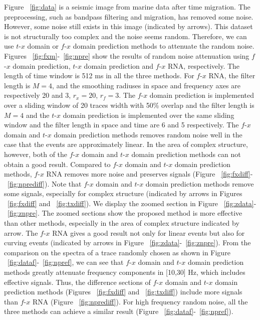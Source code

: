 Figure ~\ref{fig:data} is a seismic image from marine data after time migration. 
The preprocessing, such as bandpass filtering and migration, has removed some noise. 
However, some noise still exists in this image (indicated by arrows). This dataset is 
not structurally too complex and the noise seems random. Therefore, we can use $t$-$x$ 
domain or $f$-$x$ domain prediction methods to attenuate the random noise. 
Figures ~\ref{fig:fxm}-~\ref{fig:npre} show the results of random noise attenuation using 
$f$-$x$ domain prediction, $t$-$x$ domain prediction and $f$-$x$ RNA, respectively. The length of 
time window is 512 ms in all the three methods. For $f$-$x$ RNA, the filter length is $M=4$, 
and the smoothing radiuses in space and frequency axes are respectively 20 and 3, 
${{r}_{x}}=20$, ${{r}_{f}}=3$. The $f$-$x$ domain prediction is implemented over a 
sliding window of 20 traces width with 50\% overlap and the filter length is $M=4$ 
and the $t$-$x$ domain prediction is implemented over the same sliding window and the 
filter length in space and time are 6 and 5 respectively. The $f$-$x$ domain and $t$-$x$ 
domain prediction methods removes random noise well in the case that the events 
are approximately linear. In the area of complex structure, however, both of the 
$f$-$x$ domain and $t$-$x$ domain prediction methods can not obtain a good result. Compared 
to $f$-$x$ domain and $t$-$x$ domain prediction methods, $f$-$x$ RNA removes more noise and 
preserves signals (Figure ~\ref{fig:fxdiff}-~\ref{fig:nprediff}). 
Note that $f$-$x$ domain and $t$-$x$ domain prediction methods remove some signals, 
especially for complex structure (indicated by arrows in Figures ~\ref{fig:fxdiff} and ~\ref{fig:txdiff}). 
We display the zoomed section in Figure ~\ref{fig:zdata}-~\ref{fig:znpre}. 
The zoomed sections show the proposed method is more effective than other methods, 
especially in the area of complex structure indicated by arrow. The $f$-$x$ RNA gives 
a good result not only for linear events but also for curving events 
(indicated by arrows in Figure ~\ref{fig:zdata}-~\ref{fig:znpre}). 
From the comparison on the spectra of a trace randomly chosen as shown in 
Figure ~\ref{fig:dataf}-~\ref{fig:npref}, we can see that $f$-$x$ domain and $t$-$x$ 
domain prediction methods greatly attenuate frequency components in [10,30] Hz, 
which includes effective signals. Thus, the difference sections of $f$-$x$ domain and 
$t$-$x$ domain prediction methods (Figures ~\ref{fig:fxdiff} and ~\ref{fig:txdiff}) 
include more signals than $f$-$x$ RNA (Figure ~\ref{fig:nprediff}). For high frequency random noise, 
all the three methods can achieve a similar result (Figure ~\ref{fig:dataf}-~\ref{fig:npref}).

